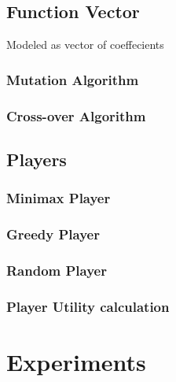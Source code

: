 \documentclass{acm_proc_article-sp}
\begin{document}

    \subsection{Function Vector}
        
        Modeled as vector of coeffecients
    
        \subsubsection{Mutation Algorithm}
        
        \subsubsection{Cross-over Algorithm}

    \subsection{Players}

        \subsubsection{Minimax Player}
    
        \subsubsection{Greedy Player}
    
        \subsubsection{Random Player}

        \subsubsection{Player Utility calculation}
        
            
\section{Experiments}
\end{document}
